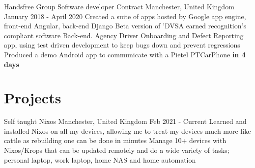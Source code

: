 \documentclass{my_cv}
\begin{document}
\workDetails
{Handsfree Group}
{Software developer}
{Contract} %
{Manchester, United Kingdom}
{January 2018 - April 2020}
\workdetails
{Created a suite of apps hosted by Google app engine, front-end Angular, back-end Django}
{Beta version of 'DVSA earned recognition's compliant software }
{Back-end. Agency Driver Onboarding and Defect Reporting app, using test driven development to keep bugs down and prevent regressions}
{Produced a demo Android app to communicate with a Pietel PTCarPhone \textbf{in 4 days}}
\stopworkdetails
%



\section{Projects}
\experianceDetails
{Self taught}
{Nixos}
{}
{Manchester, United Kingdom}
{Feb 2021 - Current}
\workdetails
{Learned and installed Nixos on all my devices, allowing me to treat my devices much more like cattle as rebuilding one can be done in minutes}
{Manage 10+ devices with Nixos/Krops that can be updated remotely and do a wide variety of tasks; personal laptop, work laptop, home NAS and home automation }
\stopworkdetails
\end{document}
